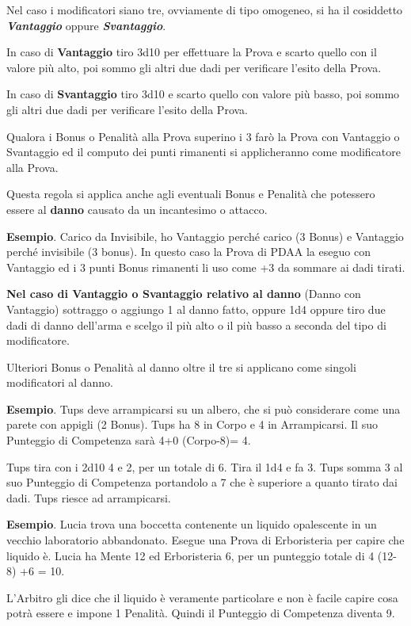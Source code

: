\documentclass[12pt,a4paper,twoside,openany]{book}
\begin{document}
\begin{multicols}{2}
Nel caso i modificatori siano tre, ovviamente di tipo omogeneo, si ha il cosiddetto \textbf{\textit{Vantaggio}} oppure \textbf{\textit{Svantaggio}}.

In caso di \textbf{Vantaggio} tiro 3d10 per effettuare la Prova e scarto quello con il valore più alto, poi sommo gli altri due dadi per verificare l'esito della Prova.

In caso di \textbf{Svantaggio} tiro 3d10 e scarto quello con valore più basso, poi sommo gli altri due dadi per verificare l'esito della Prova.

Qualora i Bonus o Penalità alla Prova superino i 3 farò la Prova con Vantaggio o Svantaggio ed il computo dei punti rimanenti si applicheranno come modificatore alla Prova.

Questa regola si applica anche agli eventuali Bonus e Penalità che potessero essere al \textbf{danno} causato da un incantesimo o attacco.

\textbf{Esempio}. Carico da Invisibile, ho Vantaggio perché carico (3 Bonus) e Vantaggio perché invisibile (3 bonus). In questo caso la Prova di PDAA la eseguo con Vantaggio ed i 3 punti Bonus rimanenti li uso come +3 da sommare ai dadi tirati.

\textbf{Nel caso di Vantaggio o Svantaggio relativo al danno} \index(Danno con Vantaggio) sottraggo o aggiungo 1 al danno fatto, oppure 1d4 oppure tiro due dadi di danno dell'arma e scelgo il più alto o il più basso a seconda del tipo di modificatore.

Ulteriori Bonus o Penalità al danno oltre il tre si applicano come singoli modificatori al danno.

\textbf{Esempio}. Tups deve arrampicarsi su un albero, che si può considerare come una parete con appigli (2 Bonus).
Tups ha 8 in Corpo e 4 in Arrampicarsi.
Il suo Punteggio di Competenza sarà 4+0 (Corpo-8)= 4.

Tups tira con i 2d10 4 e 2, per un totale di 6. Tira il 1d4 e fa 3.
Tups somma 3 al suo Punteggio di Competenza portandolo a 7 che è superiore a quanto tirato dai dadi. Tups riesce ad arrampicarsi.

\textbf{Esempio}. Lucia trova una boccetta contenente un liquido opalescente in un vecchio laboratorio abbandonato.
Esegue una Prova di Erboristeria per capire che liquido è.
Lucia ha Mente 12 ed Erboristeria 6, per un punteggio totale di 4 (12-8) +6 = 10.

L'Arbitro gli dice che il liquido è veramente particolare e non è facile capire cosa potrà essere e impone 1 Penalità. Quindi il Punteggio di Competenza diventa 9.


\end{multicols}
\end{document}
